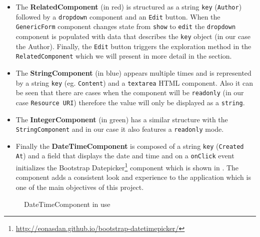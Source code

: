 \begin{itemize}
	\item The \textbf{RelatedComponent} (in red) is structured as a string \texttt{key} (\texttt{Author}) followed by a \texttt{dropdown} component and an \texttt{Edit} button. When the \texttt{GenericForm} component changes state from \texttt{show} to \texttt{edit} the \texttt{dropdown} component is populated with data that describes the \texttt{key} object (in our case the Author). Finally, the \texttt{Edit} button triggers the exploration method in the \texttt{RelatedComponent} which we will present in more detail in the  section.
	\item The \textbf{StringComponent} (in blue) appears multiple times and is represented by a string \texttt{key} (eg. \texttt{Content}) and a \texttt{textarea} HTML component. Also it can be seen that there are cases when the component will be \texttt{readonly} (in our case \texttt{Resource URI}) therefore the value will only be displayed as a \texttt{string}.
	\item The \textbf{IntegerComponent} (in green) has a similar structure with the \texttt{StringComponent} and in our case it also features a \texttt{readonly} mode.
	\item Finally the \textbf{DateTimeComponent} is composed of a string \texttt{key} (\texttt{Created At}) and a field that displays the date and time and on a \texttt{onClick} event initializes the Bootstrap Datepicker\footnote{\url{http://eonasdan.github.io/bootstrap-datetimepicker/}} component which is shown in . The component adds a consistent look and experience to the application which is one of the main objectives of this project.
\end{itemize}
\begin{figure}[H]
	\centering
	\caption{DateTimeComponent in use\label{img:date-time-panel}}
\end{figure}


